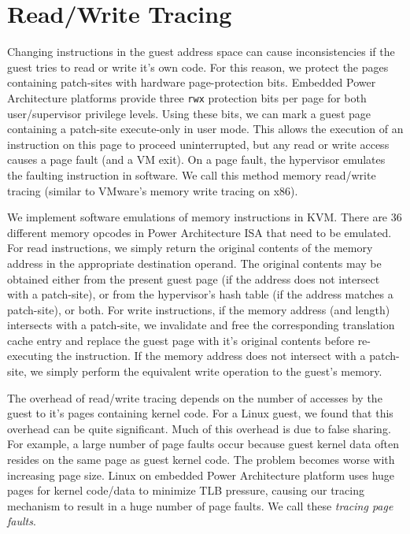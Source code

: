 \documentclass[10pt,twocolumn]{article}
\begin{document}
\section{Read/Write Tracing}
\label{sec:tracing}
Changing instructions in the guest address space can cause
inconsistencies if the guest tries to read or write it's own code.
For this reason, we protect the pages containing patch-sites with hardware
page-protection bits. Embedded Power Architecture platforms provide three {\tt rwx}
protection bits per page for both user/supervisor privilege levels. Using these
bits, we can mark a guest page containing a patch-site
execute-only in user mode. This allows the
execution of an instruction on this page to proceed uninterrupted,
but any read or write access causes a page fault (and a VM exit).
On a page fault, the hypervisor
emulates the faulting instruction in software. We call this
method memory read/write tracing (similar to VMware's memory write tracing
on x86\cite{adams:asplos06}).

We implement software emulations of memory instructions in KVM. There are 36
different memory opcodes in Power Architecture ISA that need to be emulated.
For read instructions, we simply return the original contents of the memory
address in the appropriate destination
operand. The original contents may be obtained either from the present guest
page (if the address does not intersect with a patch-site), or from the hypervisor's
hash table (if the address matches a patch-site), or both.
For write instructions, if the memory address (and length) intersects with a patch-site,
we invalidate and free the corresponding translation cache
entry and replace the guest page with it's original contents before
re-executing the instruction. If the memory address does not intersect with a
patch-site, we simply perform the equivalent write operation to the guest's memory.

The overhead of read/write tracing depends on the number of accesses by the guest
to it's pages containing kernel code. For a Linux guest, we found that this overhead
can be quite significant.
Much of this overhead is due to false sharing. For example, a large number of page
faults occur because guest kernel data often resides on the same page as
guest kernel code. The problem becomes worse with increasing page size. Linux
on embedded
Power Architecture platform uses huge pages for kernel code/data to minimize
TLB pressure, causing our tracing mechanism to result in a huge number of page
faults. We call these {\em tracing page faults}.
\end{document}
